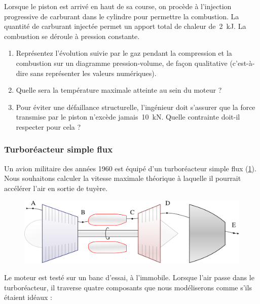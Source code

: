 	Lorsque le piston est arrivé en haut de sa course, on procède à l’injection progressive de carburant dans le cylindre pour permettre la combustion. La quantité de carburant injectée permet un apport total de chaleur de~\SI{2}{\kilo\joule}. La combustion se déroule à pression constante.
	
	\begin{enumerate}
		\item Représentez l’évolution suivie par le gaz pendant la compression et la combustion sur un diagramme pression-volume, de façon qualitative (c’est-à-dire sans représenter les valeurs numériques).
		\item Quelle sera la température maximale atteinte au sein du moteur ?
		\item Pour éviter une défaillance structurelle, l’ingénieur doit s’assurer que la force transmise par le piston n’excède jamais~\SI{10}{\kilo\newton}. Quelle contrainte doit-il respecter pour cela ?
	\end{enumerate}
	

\subsubsection{Turboréacteur simple flux}
\label{exo_turboreacteur_simple_flux}

	Un avion militaire des années 1960 est équipé d’un turboréacteur simple flux (\cref{fig_exo_turbojet}). Nous souhaitons calculer la vitesse maximale théorique à laquelle il pourrait accélérer l’air en sortie de tuyère.
	
	\begin{figure}
		\begin{center}
			\includegraphics[width=\textwidth]{images/turbojet.png}
		\end{center}
		\label{fig_exo_turbojet}
	\end{figure}
	
	Le moteur est testé sur un banc d’essai, à l’immobile. Lorsque l’air passe dans le turboréacteur, il traverse quatre composants que nous modéliserons comme s’ils étaient idéaux :
	
